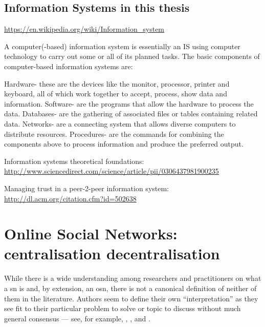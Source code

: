 \documentclass[showtrims,oldfontcommands]{kthesis}
\begin{document}
\subsection{Information Systems in this thesis}
    \label{subsection:information-system-in-this-thesis}

\url{https://en.wikipedia.org/wiki/Information_system}

A computer(-based) information system is essentially an IS using computer technology to carry out some or all of its planned tasks. The basic components of computer-based information systems are:

Hardware- these are the devices like the monitor, processor, printer and keyboard, all of which work together to accept, process, show data and information.
Software- are the programs that allow the hardware to process the data.
Databases- are the gathering of associated files or tables containing related data.
Networks- are a connecting system that allows diverse computers to distribute resources.
Procedures- are the commands for combining the components above to process information and produce the preferred output.

Information systems theoretical foundations: \url{http://www.sciencedirect.com/science/article/pii/0306437981900235}

Managing trust in a peer-2-peer information system: \url{http://dl.acm.org/citation.cfm?id=502638}


\section{Online Social Networks: centralisation \vs decentralisation}
    \label{section:osns-centralisation-vs-decentralisation}
While there is a wide understanding among researchers and practitioners on what 
a \ac{sn} is and, by extension, an \ac{osn}, there is not a canonical definition 
of neither of them in the literature. Authors seem to define their own ``interpretation'' 
as they see fit to their particular problem to solve or topic to discuss without 
much general consensus --- see, for example, \cite{AdamicA05}, \cite{DwyerHP07}, \cite{SchneiderFKW09} 
and \cite{RichterRB11}.
\end{document}
